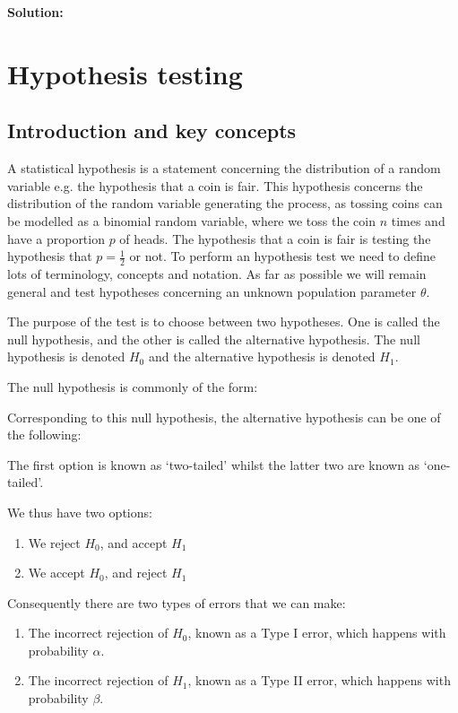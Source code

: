 \documentclass[12pt]{article}
\theoremstyle{break}
\begin{document}
\begin{mdframed}
{\bf Solution:}
\textcolor[rgb]{1.00,1.00,1.00}{\lipsum[1-3]}
\end{mdframed}

\newpage
\section{Hypothesis testing}
\subsection{Introduction and key concepts}
A statistical hypothesis is a statement concerning the distribution of a random variable e.g. the hypothesis that a coin is fair. This hypothesis concerns the distribution of the random variable generating the process, as tossing coins can be modelled as a binomial random variable, where we toss the coin $n$ times and have a proportion $p$ of heads. The hypothesis that a coin is fair is testing the hypothesis that $p=\frac{1}{2}$ or not. To perform an hypothesis test we need to define lots of terminology, concepts and notation. As far as possible we will remain general and test hypotheses concerning an unknown population parameter $\theta.$

The purpose of the test is to choose between two hypotheses. One is called the null hypothesis, and the other is called the alternative hypothesis.
The null hypothesis is denoted $H_0$ and the alternative hypothesis is denoted $H_1$.

The null hypothesis is commonly of the form:
\begin{mdframed}
\textcolor[rgb]{1.00,1.00,1.00}{\lipsum[1]}
\end{mdframed}

Corresponding to this null hypothesis, the alternative hypothesis can be one of the following:
\begin{mdframed}
\textcolor[rgb]{1.00,1.00,1.00}{\lipsum[1]}
The first option is known as `two-tailed' whilst the latter two are known as `one-tailed'.
\end{mdframed}

We thus have two options:
\begin{enumerate}
\item We reject $H_{0}$, and accept $H_{1}$
\item We accept $H_{0}$, and reject $H_{1}$
\end{enumerate}

Consequently there are two types of errors that we can make:
\begin{enumerate}
\item The incorrect rejection of $H_{0}$, known as a Type I error, which happens with probability $\alpha$.
\item The incorrect rejection of $H_{1}$, known as a Type II error, which happens with probability $\beta$.
\end{enumerate}
\end{document}
